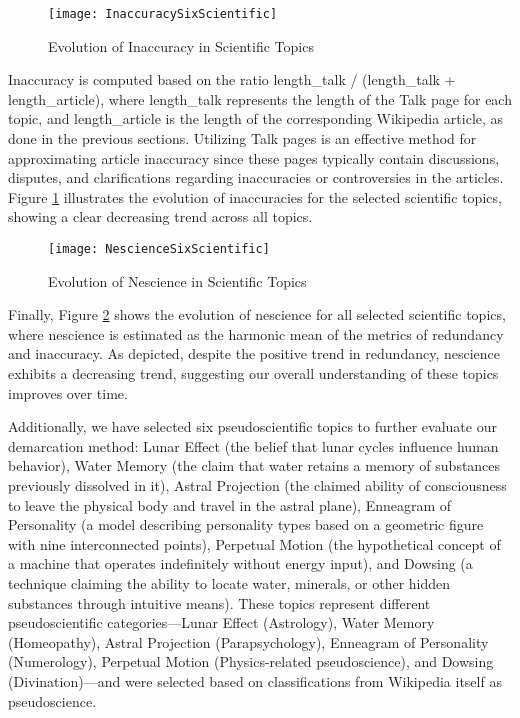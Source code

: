 \begin{figure}[H]
\centering\texttt{[image: InaccuracySixScientific]}
\caption{\label{fig:inaccuracy_six_scientific}Evolution of Inaccuracy in Scientific Topics}
\end{figure}

Inaccuracy is computed based on the ratio length\_talk / (length\_talk + length\_article), where length\_talk represents the length of the Talk page for each topic, and length\_article is the length of the corresponding Wikipedia article, as done in the previous sections. Utilizing Talk pages is an effective method for approximating article inaccuracy since these pages typically contain discussions, disputes, and clarifications regarding inaccuracies or controversies in the articles. Figure \ref{fig:inaccuracy_six_scientific} illustrates the evolution of inaccuracies for the selected scientific topics, showing a clear decreasing trend across all topics.

\begin{figure}[H]
\centering\texttt{[image: NescienceSixScientific]}
\caption{\label{fig:nescience_six_scientific}Evolution of Nescience in Scientific Topics}
\end{figure}

Finally, Figure \ref{fig:nescience_six_scientific} shows the evolution of nescience for all selected scientific topics, where nescience is estimated as the harmonic mean of the metrics of redundancy and inaccuracy. As depicted, despite the positive trend in redundancy, nescience exhibits a decreasing trend, suggesting our overall understanding of these topics improves over time.

Additionally, we have selected six pseudoscientific topics to further evaluate our demarcation method: Lunar Effect (the belief that lunar cycles influence human behavior), Water Memory (the claim that water retains a memory of substances previously dissolved in it), Astral Projection (the claimed ability of consciousness to leave the physical body and travel in the astral plane), Enneagram of Personality (a model describing personality types based on a geometric figure with nine interconnected points), Perpetual Motion (the hypothetical concept of a machine that operates indefinitely without energy input), and Dowsing (a technique claiming the ability to locate water, minerals, or other hidden substances through intuitive means). These topics represent different pseudoscientific categories—Lunar Effect (Astrology), Water Memory (Homeopathy), Astral Projection (Parapsychology), Enneagram of Personality (Numerology), Perpetual Motion (Physics-related pseudoscience), and Dowsing (Divination)—and were selected based on classifications from Wikipedia itself as pseudoscience.

